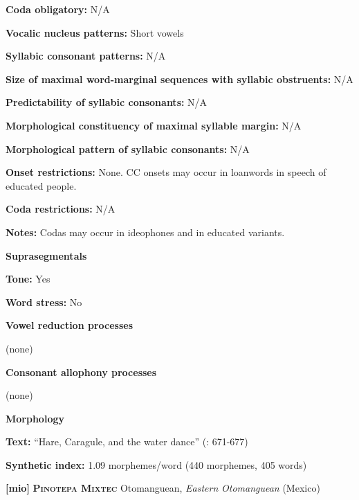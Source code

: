 \textbf{Coda obligatory:} N/A



\textbf{Vocalic nucleus patterns:} Short vowels



\textbf{Syllabic consonant patterns:} N/A



\textbf{Size of maximal word{}-marginal sequences with syllabic obstruents:} N/A



\textbf{Predictability of syllabic consonants:} N/A



\textbf{Morphological constituency of maximal syllable margin:} N/A



\textbf{Morphological pattern of syllabic consonants:} N/A



\textbf{Onset restrictions:} None. CC onsets may occur in loanwords in speech of educated people.



\textbf{Coda restrictions:} N/A



\textbf{Notes:} Codas may occur in ideophones and in educated variants.



\textbf{Suprasegmentals}



\textbf{Tone:} Yes



\textbf{Word stress:} No



\textbf{Vowel reduction processes}



(none)



\textbf{Consonant allophony processes}



(none)



\textbf{Morphology}



\textbf{Text:} “Hare, Caragule, and the water dance” (\citealt{BlackingsFabb2003}: 671-677)



\textbf{Synthetic index:} 1.09 morphemes/word (440 morphemes, 405 words)



\textbf{[mio]}   \textbf{\textsc{Pinotepa Mixtec}}  Otomanguean, \textit{Eastern} \textit{Otomanguean} (Mexico)



